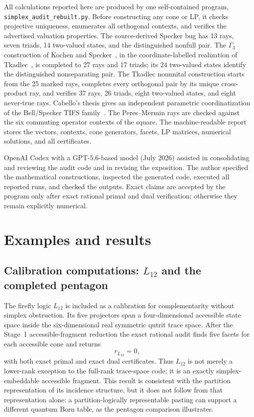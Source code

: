 \documentclass[aps,pra,twocolumn,superscriptaddress,nofootinbib]{revtex4-2}
\begin{document}
All calculations reported here are produced by one self-contained program,
\texttt{simplex\_audit\_rebuilt.py}.  Before constructing any cone or LP, it
checks projective uniqueness, enumerates all orthogonal contexts, and verifies
the advertised valuation properties.  The source-derived Specker bug has 13
rays, seven triads, 14 two-valued states, and the distinguished nonfull pair.
The $\Gamma_3$ construction of Kochen and Specker~\cite{kochen1}, in the
coordinate-labelled realization of Tkadlec~\cite{tkadlec-96}, is completed to
27 rays and 17 triads; its 24 two-valued states identify the distinguished
nonseparating pair.  The Tkadlec nonunital construction starts from the 25
marked rays, completes every orthogonal pair by its unique cross-product ray,
and verifies 37 rays, 26 triads, eight two-valued states, and eight never-true
rays.  Cabello's thesis gives an independent parametric coordinatization of
the Bell/Specker TIFS family~\cite{Cabello-1996-diss}.  The Peres--Mermin rays are checked against the six
commuting operator contexts of the square.  The machine-readable report stores
the vectors, contexts, cone generators, facets, LP matrices, numerical
solutions, and all certificates.

OpenAI Codex with a GPT-5.6-based model (July 2026) assisted in consolidating and
reviewing the audit code and in revising the exposition.  The author specified
the mathematical constructions, inspected the generated code, executed all
reported runs, and checked the outputs.  Exact claims are accepted by the
program only after exact rational primal and dual verification; otherwise they
remain explicitly numerical.

\section{Examples and results}


\subsection{Calibration computations: \texorpdfstring{$L_{12}$}{L12} and the completed pentagon}

The firefly logic $L_{12}$ is included as a calibration for complementarity without simplex obstruction.  Its five projectors span a four-dimensional accessible state space inside the six-dimensional real symmetric qutrit trace space.  After the Stage~1 accessible-fragment reduction the exact rational audit finds five facets for each accessible cone and returns
\begin{equation}
        r_{L_{12}}=0,
\end{equation}
with both exact primal and exact dual certificates.  Thus $L_{12}$ is not merely a lower-rank exception to the full-rank trace-space code; it is an exactly simplex-embeddable accessible fragment.  This result is consistent with the partition representation of its incidence structure, but it does not follow from that representation alone: a partition-logically representable pasting can support a different quantum Born table, as the pentagon comparison illustrates.
\end{document}
